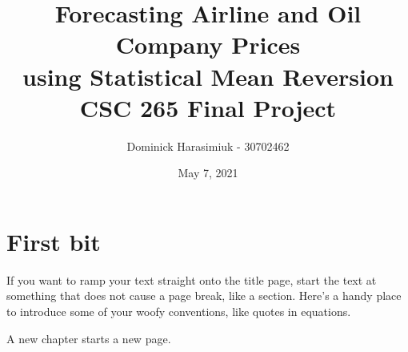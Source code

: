 \documentclass{article}
\title{Forecasting Airline and Oil Company Prices \\
using Statistical Mean Reversion \\
\large CSC 265 Final Project}
\author{Dominick Harasimiuk - 30702462}
\date{May 7, 2021}
\begin{document}
\maketitle

\vspace{1cm}

\begin{abstract}
\noindent
\lipsum[1]
\end{abstract}

\newpage
\section*{First bit}
If you want to ramp your text straight onto the title page, start the text at 
something that does not cause a page break, like a section.  Here's a handy 
place to introduce some of your woofy conventions, like quotes in equations.

A new chapter starts a new page.  
\end{document}
